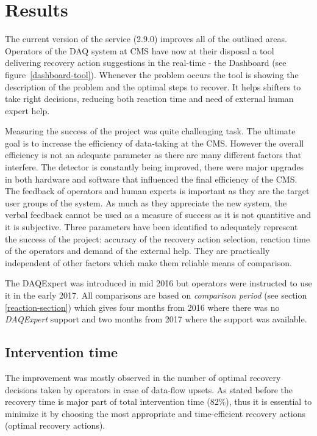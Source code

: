 \documentclass[a4paper]{jpconf}
\begin{document}
\section{Results}

The current version of the service (2.9.0) improves all of the outlined areas. Operators of the DAQ system at CMS have now at their disposal a tool delivering recovery action suggestions in the real-time - the Dashboard (see figure~\ref{dashboard-tool}). Whenever the problem occurs the tool is showing the description of the problem and the optimal steps to recover. It helps shifters to take right decisions, reducing both reaction time and need of external human expert help.

Measuring the success of the project was quite challenging task. The ultimate goal is to increase the efficiency of data-taking at the CMS. However the overall efficiency is not an adequate parameter as there are many different factors that interfere. The detector is constantly being improved, there were major upgrades in both hardware and software that influenced the final efficiency of the CMS. The feedback of operators and human experts is important as they are the target user groups of the system. As much as they appreciate the new system, the verbal feedback cannot be used as a measure of success as it is not quantitive and it is subjective. Three parameters have been identified to adequately represent the success of the project: accuracy of the recovery action selection, reaction time of the operators and demand of the external help. They are practically independent of other factors which make them reliable means of comparison.

The DAQExpert was introduced in mid 2016 but operators were instructed to use it in the early 2017. All comparisons are based on {\it comparison period} (see section \ref{reaction-section}) which gives four months from 2016 where there was no {\it DAQExpert} support and two months from 2017 where the support was available. 


\subsection{Intervention time}

The improvement was mostly observed in the number of optimal recovery decisions taken by operators in case of data-flow upsets. As stated before the recovery time is major part of total intervention time (82\%), thus it is essential to minimize it by choosing the most appropriate and time-efficient recovery actions (optimal recovery actions). 
\end{document}
